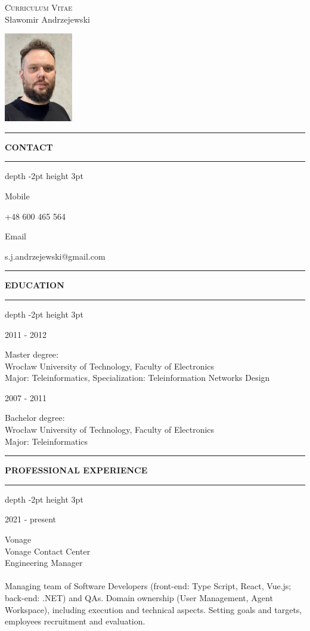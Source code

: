 \documentclass[a4paper]{article}
\makeatletter
\newcommand*{\thickhrulefill}{%
\color{nokiaBlue}
\leavevmode %
\leaders\hrule depth -2pt height 3pt \hfill
\kern 0pt\relax %
\color{black}
}
\newcommand*{\thickhrule}{%
\color{nokiaBlue}
\rule[2pt]{0.7cm}{1pt}
\color{black}
}
\def\cvsekcja#1{%
\vspace{0.1cm}
\noindent\thickhrule
\MakeUppercase{\textbf{\footnotesize#1}}
\hspace{0.1cm}\color{nokiaBlue}\thickhrulefill
}
\def\cvwpis#1#2{%
\noindent
\newline
\begin{minipage}[t]{0.2\textwidth}
  \begin{flushleft}
  #1 
\end{flushleft}
\end{minipage}
\begin{minipage}[t]{0.8\textwidth}
  #2
\end{minipage}
}
\makeatother
\begin{document}
\begin{center}
  \large{\textsc{Curriculum Vitae}\\
  Sławomir Andrzejewski}
\end{center}


\hfill
\begin{minipage}[b]{3.1cm}
  \vspace{-2.5cm}
\includegraphics[width=3cm]{zdjecie}
\end{minipage}

\cvsekcja{Contact}

\cvwpis{Mobile}{+48 600 465 564}
\cvwpis{E\dywiz mail}{s.j.andrzejewski@gmail.com}



\cvsekcja{Education}

\cvwpis{2011 - 2012}
{Master degree:\\
Wrocław University of Technology, Faculty of Electronics\\
Major: Teleinformatics, Specialization: Teleinformation Networks Design}

\cvwpis{2007 - 2011}
{ Bachelor degree:\\
Wrocław University of Technology, Faculty of Electronics\\
Major: Teleinformatics}

\cvsekcja{Professional Experience}

\cvwpis{2021 - present}
{Vonage\\
Vonage Contact Center\\
Engineering Manager\\
\vspace{-7pt}
\\Managing team of Software Developers (front-end: Type Script, React, Vue.js; back-end: .NET) and QAs.
Domain ownership (User Management, Agent Workspace), including execution and technical aspects.
Setting goals and targets, employees recruitment and evaluation. 
}
\end{document}
